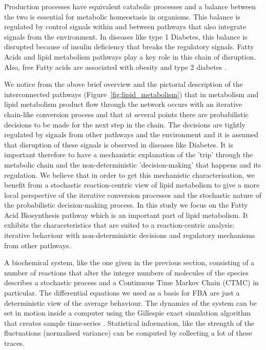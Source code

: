 Production processes have equivalent catabolic
processes and a balance between the two is essential for metabolic
homeostasis in organisms. This balance is regulated by control signals
within and
between pathways that also integrate signals from the
environment. In diseases like type 1 Diabetes, this balance is
disrupted because of insulin deficiency that breaks the regulatory
signals. Fatty Acids and lipid metabolism pathways play a key role
in this chain of disruption. Also, free Fatty acids are
associated with obesity and type 2 diabetes \cite [] {boden2002free}.

We notice from the above brief overview and the pictorial description
of the interconnected pathways (Figure~\ref{fig:lipid_metabolism}) that
in metabolism and lipid metabolism product flow through the
network occurs with an iterative chain-like conversion process and that at
several points there are probabilistic decisions to be made for the next step in the
chain. The decisions are tightly regulated by signals from other
pathways and the environment and it is assumed that disruption of these signals is
observed in diseases like Diabetes. It is important therefore to have
a mechanistic explanation of the 'trip' through the metabolic chain
and the non-deterministic 'decision-making' that happens and its regulation. We believe
that in order to get this mechanistic characterisation, we
benefit from a stochastic reaction-centric view of lipid metabolism to
give a more local perspective of the iterative conversion processes
and the stochastic nature of the probabilistic
decision-making process. In this study we
focus on the Fatty Acid Biosynthesis pathway which is an important
part of lipid metabolism. It exhibits the characeteristics that are
suited to a reaction-centric analysis: iterative behaviour with
non-deterministic decisions and regulatory mechanisms from other pathways.

A biochemical system, like the one given in the previous section,
consisting of a number of reactions that alter the integer numbers of
molecules of the species describes a stochastic process and a Continuous
Time Markov Chain (CTMC) in particular. The differential equations we used as
a basis for FBA are just a
deterministic view of the average behaviour. The dynamics of the
system can be set in motion inside a computer using the Gillespie
exact simulation algorithm that creates sample
time-series \cite [] {gillespie1977exact}. Statistical information, like the strength of the
fluctuations (normalised variance) can be computed by collecting a lot
of these traces.

